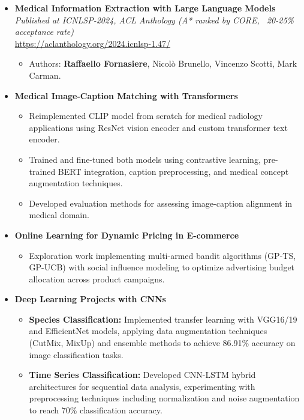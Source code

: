 \documentclass[a4paper,9pt]{article}
\newcommand{\cvsection}[2]{
    \vspace{0.3cm} %
    \noindent {\large \textbf{#1}} %
    \begin{itemize}
        \renewcommand{\labelitemi}{}
        \small #2 %
    \end{itemize}
}
\begin{document}
\cvsection{Publications}{
    \item \textbf{Medical Information Extraction with Large Language Models} \\
    \textit{Published at ICNLSP-2024, ACL Anthology (A* ranked by CORE, ~20-25\% acceptance rate)} \\
    \url{https://aclanthology.org/2024.icnlsp-1.47/}
    \begin{itemize}
        \item Authors: \textbf{Raffaello Fornasiere}, Nicolò Brunello, Vincenzo Scotti, Mark Carman.
    \end{itemize}
}
\pagebreak


\cvsection{Academic Projects}{
    \item \textbf{Medical Image-Caption Matching with Transformers}
    \begin{itemize}
       \item Reimplemented CLIP model from scratch for medical radiology applications using ResNet vision encoder and custom transformer text encoder.
       \item Trained and fine-tuned both models using contrastive learning, pre-trained BERT integration, caption preprocessing, and medical concept augmentation techniques.
       \item Developed evaluation methods for assessing image-caption alignment in medical domain.
    \end{itemize}
    \item \textbf{Online Learning for Dynamic Pricing in E-commerce}
    \begin{itemize}
        \item Exploration work implementing multi-armed bandit algorithms (GP-TS, GP-UCB) with social influence modeling to optimize advertising budget allocation across product campaigns.
    \end{itemize}
    \item \textbf{Deep Learning Projects with CNNs}
    \begin{itemize}
        \item \textbf{Species Classification:} Implemented transfer learning with VGG16/19 and EfficientNet models, applying data augmentation techniques (CutMix, MixUp) and ensemble methods to achieve 86.91\% accuracy on image classification tasks.
        
        \item \textbf{Time Series Classification:} Developed CNN-LSTM hybrid architectures for sequential data analysis, experimenting with preprocessing techniques including normalization and noise augmentation to reach 70\% classification accuracy.
    \end{itemize}
}
\end{document}
